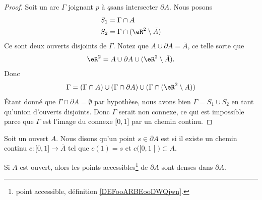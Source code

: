 \begin{proof}
	Soit un arc \( \Gamma\) joignant \( p\) à \( q\)sans intersecter \( \partial A\). Nous posons
	\begin{subequations}
		\begin{align}
			S_1 & =\Gamma\cap A                      \\
			S_2 & =\Gamma\cap(\eR^2\setminus \bar A)
		\end{align}
	\end{subequations}
	Ce sont deux ouverts disjoints de \( \Gamma\). Notez que \( A\cup\partial A=\bar A\), ce telle sorte que
	\begin{equation}
		\eR^2=A\cup\partial A\cup(\eR^2\setminus \bar A).
	\end{equation}
	Donc
	\begin{equation}
		\Gamma=(\Gamma\cap A)\cup(\Gamma\cap\partial A)\cup(\Gamma\cap(\eR^2\setminus A))
	\end{equation}
	Étant donné que \( \Gamma\cap\partial A=\emptyset\) par hypothèse, nous avons bien \( \Gamma=S_1\cup S_2\) en tant qu'union d'ouverts disjoints. Donc \( \Gamma\) serait non connexe, ce qui est impossible parce que \( \Gamma\) est l'image du connexe \( \mathopen[ 0,1\mathclose]\) par un chemin continu.
\end{proof}

\begin{definition}	\label{DEFooARBEooDWQjwn}
	Soit un ouvert \( A\). Nous disons qu'un point \( s\in\partial A\) est  si il existe un chemin continu \(c \colon \mathopen[ 0,1\mathclose]\to \bar A  \) tel que \( c(1)=s\) et \( c\big( \mathopen[ 0,1\mathclose[ \big)\subset A\).
\end{definition}

\begin{proposition}	\label{PROPooCASWooIoWegN}
	Si \( A\) est ouvert, alors les points accessibles\footnote{point accessible, définition \ref{DEFooARBEooDWQjwn}.} de \( \partial A\) sont denses dans \( \partial A\).
\end{proposition}

